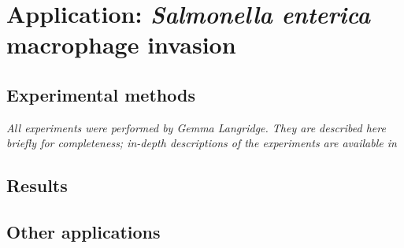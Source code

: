 \section{Application: \textit{Salmonella enterica} macrophage invasion}

\subsection{Experimental methods}

\textit{All experiments were performed by Gemma Langridge. They are described here briefly for completeness; in-depth descriptions of the experiments are available in \parencite{Langridge2010}}


\subsection{Results}

\subsection{Other applications}